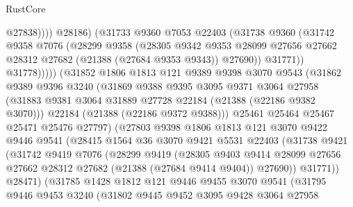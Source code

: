 \begin{lexlean}{RustCore}
\begin{coremodule}
                          @27838))))
                  @28186)
                (@31733
                  @9360
                  @7053
                  @22403
                  (@31738
                    @9360
                    (@31742
                      @9358
                      @7076
                      (@28299
                        @9358
                        (@28305
                          @9342
                          @9353
                          @28099
                          @27656
                          @27662
                          @28312
                          @27682
                          (@21388 (@27684 @9353 @9343))
                          @27690))
                      @31771))
                  @31778)))))
        (@31852
          @1806
          @1813
          @121
          @9389
          @9398
          @3070
          @9543
          (@31862
            @9389
            @9396
            @3240
            (@31869
              @9388
              @9395
              @3095
              @9371
              @3064
              @27958
              (@31883 @9381 @3064 @31889 @27728 @22184 (@21388 (@22186 @9382 @3070)))
              @22184
              (@21388 (@22186 @9372 @9388)))
            @25461
            @25464
            @25467
            @25471
            @25476
            @27797)
          (@27803
            @9398
            @1806
            @1813
            @121
            @3070
            @9422
            @9446
            @9541
            (@28415
              @1564
              @36
              @3070
              @9421
              @5531
              @22403
              (@31738
                @9421
                (@31742
                  @9419
                  @7076
                  (@28299
                    @9419
                    (@28305
                      @9403
                      @9414
                      @28099
                      @27656
                      @27662
                      @28312
                      @27682
                      (@21388 (@27684 @9414 @9404))
                      @27690))
                  @31771))
              @28471)
            (@31785
              @1428
              @1812
              @121
              @9446
              @9455
              @3070
              @9541
              (@31795
                @9446
                @9453
                @3240
                (@31802
                  @9445
                  @9452
                  @3095
                  @9428
                  @3064
                  @27958

\end{coremodule}
\end{lexlean}

